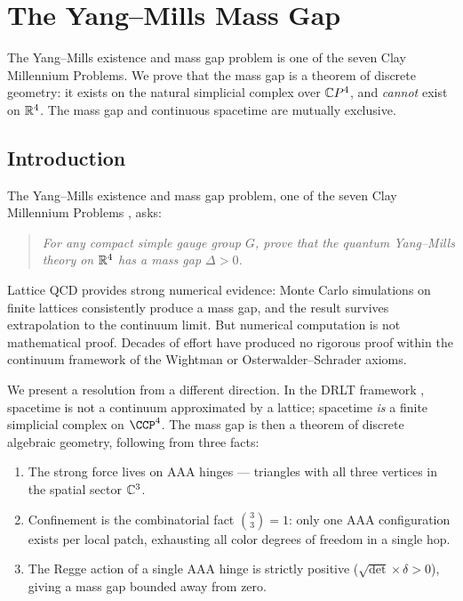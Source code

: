 \section{The Yang--Mills Mass Gap}
\label{ch:yang_mills}

The Yang--Mills existence and mass gap problem is one of the seven Clay Millennium Problems. We prove that the mass gap is a theorem of discrete geometry: it exists on the natural simplicial complex over $\mathbb{C}P^4$, and \emph{cannot} exist on $\mathbb{R}^4$. The mass gap and continuous spacetime are mutually exclusive.

\subsection{Introduction}
\label{sec:intro}

The Yang--Mills existence and mass gap problem, one of the seven Clay
Millennium Problems \cite{Clay}, asks:

\begin{quote}
\emph{For any compact simple gauge group $G$, prove that the quantum
Yang--Mills theory on $\mathbb{R}^4$ has a mass gap $\Delta > 0$.}
\end{quote}

\noindent
Lattice QCD \cite{Wilson, Creutz} provides strong numerical evidence:
Monte Carlo simulations on finite lattices consistently produce a mass
gap, and the result survives extrapolation to the continuum limit. But
numerical computation is not mathematical proof. Decades of effort have
produced no rigorous proof within the continuum framework of the Wightman
\cite{Wightman} or Osterwalder--Schrader \cite{OS} axioms.

We present a resolution from a different direction. In the DRLT framework
, spacetime is not a continuum approximated by a
lattice; spacetime \emph{is} a finite simplicial complex on
$\CCP^4$. The mass gap is then a theorem of discrete algebraic
geometry, following from three facts:

\begin{enumerate}
\item The strong force lives on AAA hinges --- triangles with all three
  vertices in the spatial sector $\mathbb{C}^3$.
\item Confinement is the combinatorial fact $\binom{3}{3} = 1$: only one
  AAA configuration exists per local patch, exhausting all color degrees
  of freedom in a single hop.
\item The Regge action of a single AAA hinge is strictly positive
  ($\sqrt{\det} \times \delta > 0$), giving a mass gap bounded away
  from zero.
\end{enumerate}

